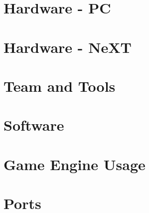 \documentclass[8pt]{book}
\begin{document}
      

   
    \chapter{Hardware - PC}
       
       
       
       
       
       



    \chapter{Hardware - NeXT}
         


    

    \chapter{Team and Tools}
          
      
      

    \chapter{Software}
      
      
      

    \chapter{Game Engine Usage}
         

    \chapter{Ports}        
          

    \appendix
    \appendixpage
          
      
    \cleartoleftpage %
    
    \blankpage
    \blankpage
\end{document}
